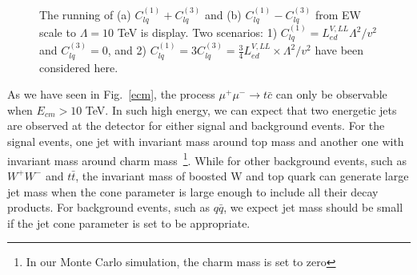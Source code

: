 \documentclass[a4paper,11pt]{article}
\begin{document}
\begin{figure}
  \centering
  \caption{The running of (a) $C^{(1)}_{lq}+C^{(3)}_{lq}$ and (b) $C^{(1)}_{lq}-C^{(3)}_{lq}$ from EW scale to $\Lambda=10$ TeV is display.  Two scenarios: 1) $C^{(1)}_{lq}=L^{V,LL}_{ed}\Lambda^2/v^2$ and $C^{(3)}_{lq}=0$, and 2) $C^{(1)}_{lq}=3C^{(3)}_{lq}=\frac{3}{4}L^{V,LL}_{ed}\times \Lambda^2/v^2$ have been considered here.\label{rge:EWtoUV}}
\end{figure}

As we have seen in Fig.~\ref{ecm}, the process $\mu^+\mu^-\to t\bar{c}$ can only be observable when $E_{cm}>10$ TeV.  
In such high energy, we can expect that two energetic jets are observed at the detector for either signal and background events. 
For the signal events, one jet with invariant mass around top mass and another one with invariant mass around charm mass~\footnote{In our Monte Carlo simulation, the charm mass is set to zero}. 
While for other background events, such as $W^+ W^-$ and $t \bar{t}$, the invariant mass of boosted W and top quark can generate large jet mass when the cone parameter is large enough to include all their decay products.
For background events, such as $q\bar{q}$, we expect jet mass should be small if the jet cone parameter is set to be appropriate.
\end{document}
